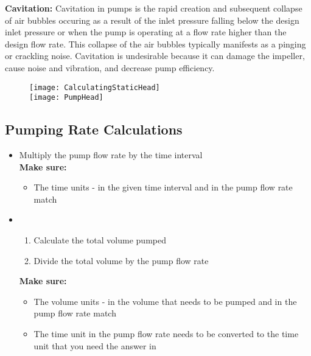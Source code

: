 \textbf{Cavitation: }  Cavitation in pumps is the rapid creation and subsequent collapse of air bubbles occuring as a result of the inlet pressure falling below the design inlet pressure or when the pump is operating at a flow rate higher than the design flow rate. This collapse of the air bubbles typically manifests as a pinging or crackling noise.  Cavitation is undesirable because it can damage the impeller, cause noise and vibration, and decrease pump efficiency.

\begin{figure}[h]
\begin{center}
\texttt{[image: CalculatingStaticHead]}\\
\texttt{[image: PumpHead]}\\
\end{center}
\end{figure}

\newpage
\subsection{Pumping Rate Calculations}
\begin{itemize}
\item {} Multiply the pump flow rate by the time interval\\
\textbf{Make sure:}
\begin{itemize}
\item The time units - in the given time interval and in the pump flow rate match
\end{itemize}
\item {}
\begin{enumerate}[Step 1.]
\item Calculate the total volume pumped
\item Divide the total volume by the pump flow rate
\end{enumerate}
\textbf{Make sure:}
\begin{itemize}
\item The volume units - in the volume that needs to be pumped and in the pump flow rate match
\item The time unit in the pump flow rate needs to be converted to the time unit that you need the answer in
\end{itemize}
\end{itemize}

